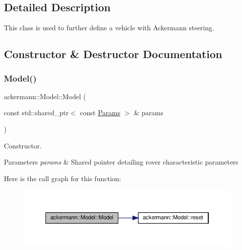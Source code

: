 \subsection{Detailed Description}
This class is used to further define a vehicle with Ackermann steering. 

\subsection{Constructor \& Destructor Documentation}
\mbox{\label{classackermann_1_1_model_ad9fa277e47f993c8089a9c388880a32c}} 
\subsubsection{\texorpdfstring{Model()}{Model()}}
{\footnotesize\ttfamily ackermann\+::\+Model\+::\+Model (\begin{DoxyParamCaption}\item[{const std\+::shared\+\_\+ptr$<$ const \hyperlink{structackermann_1_1_params}{Params} $>$ \&}]{params }\end{DoxyParamCaption})\hspace{0.3cm}{\ttfamily [explicit]}}



Constructor. 


\begin{DoxyParams}{Parameters}
{\em params} & Shared pointer detailing rover characteristic parameters \\
\hline
\end{DoxyParams}
Here is the call graph for this function\+:
\nopagebreak
\begin{figure}[H]
\begin{center}
\leavevmode
\includegraphics[width=350pt]{classackermann_1_1_model_ad9fa277e47f993c8089a9c388880a32c_cgraph}
\end{center}
\end{figure}


